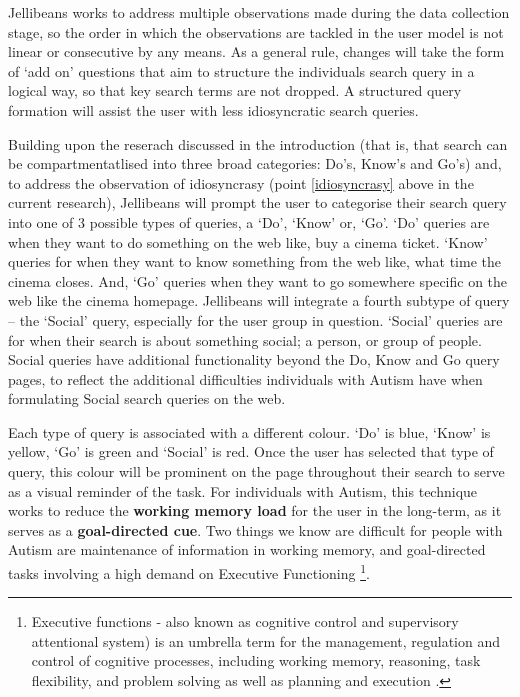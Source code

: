\documentclass[a4paper, 11pt]{article}
\begin{document}
\vspace{5mm} %
Jellibeans works to address multiple observations made during the data collection stage, so the order in which the observations are tackled in the user model is not linear or consecutive by any means. As a general rule, changes will take the form of `add on' questions that aim to structure the individuals search query in a logical way, so that key search terms are not dropped. A structured query formation will assist the user with less idiosyncratic search queries. \\


\vspace{5mm} %

Building upon the reserach discussed in the introduction \cite{seo} (that is, that search can be compartmentatlised into three broad categories: Do's, Know's and Go's) and, to address the observation of idiosyncrasy (point \ref{idiosyncrasy} above in the current research), Jellibeans will prompt the user to categorise their search query into one of 3 possible types of queries, a `Do', `Know' or, `Go'. `Do' queries are when they want to do something on the web like, buy a cinema ticket. `Know' queries for when they want to know something from the web like, what time the cinema closes. And, `Go' queries when they want to go somewhere specific on the web like the cinema homepage. Jellibeans will integrate a fourth subtype of query -- the `Social' query, especially for the user group in question. `Social' queries are for when their search is about something social; a person, or group of people. Social queries have additional functionality beyond the Do, Know and Go query pages, to reflect the additional difficulties individuals with Autism have when formulating Social search queries on the web.

\vspace{5mm}
Each type of query is associated with a different colour. `Do' is blue, `Know' is yellow, `Go' is green and `Social' is red. Once the user has selected that type of query, this colour will be prominent on the page throughout their search to serve as a visual reminder of the task. For individuals with Autism, this technique works to reduce the \textbf{working memory load} for the user in the long-term, as it serves as a \textbf{goal-directed cue}. Two things we know are difficult for people with Autism are maintenance of information in working memory, and goal-directed tasks involving a high demand on Executive Functioning \footnote{Executive functions - also known as cognitive control and supervisory attentional system) is an umbrella term for the management, regulation and control of cognitive processes, including working memory, reasoning, task flexibility, and problem solving as well as planning and execution \cite{EF}.}.
\end{document}
